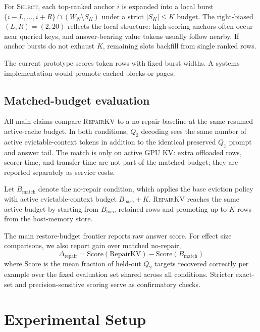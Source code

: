 \documentclass{article}
\newcommand{\repairkv}{\textsc{RepairKV}}
\newcommand{\bbase}{\ensuremath{B_{\mathrm{base}}}}
\newcommand{\bmatch}{\ensuremath{B_{\mathrm{match}}}}
\begin{document}
For \textsc{Select}, each top-ranked anchor $i$ is
expanded into a local burst $\{i{-}L,\dots,i{+}R\} \cap (W_N \setminus
S_K)$ under a strict $|S_K| \le K$ budget. The right-biased
$(L, R) = (2, 20)$ {reflects the local structure: high-scoring anchors often occur near queried keys, and answer-bearing value tokens usually follow nearby.} If anchor bursts do not exhaust $K$,
remaining slots backfill from single ranked rows.

The current prototype scores token rows with fixed burst widths. A systems implementation would promote cached blocks or pages.

\subsection{Matched-budget evaluation}
All main claims compare \repairkv{} to a no-repair baseline at the same
resumed active-cache budget. {In both conditions, $Q_2$ decoding sees the same number} of active evictable-context tokens in addition to the
identical preserved $Q_1$ prompt and answer tail. The match is only on active GPU KV: extra offloaded rows, scorer time, and transfer time are not part of the matched budget; they are reported separately as service costs.

{Let $\bmatch$ denote the no-repair condition, which applies the base eviction policy with active evictable-context budget $\bbase+K$. \repairkv{} reaches the same active budget by starting from $\bbase$ retained rows and promoting up to $K$ rows from the host-memory store.

The main restore-budget frontier reports raw answer score. For effect size comparisons, we also report gain over matched no-repair,
\begin{equation}
  \Delta_{\mathrm{repair}} =
  \mathrm{Score}(\mathrm{RepairKV}) - \mathrm{Score}(B_{\mathrm{match}})
\end{equation}
where $\mathrm{Score}$ is the mean fraction of held-out $Q_2$ targets recovered correctly per example over the fixed evaluation set shared across all conditions. Stricter exact-set and precision-sensitive scoring serve as confirmatory checks.}

\section{Experimental Setup}
\label{sec:setup}
\end{document}
